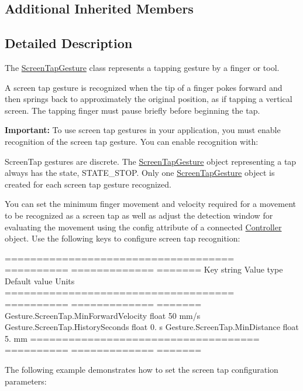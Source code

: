 \subsection*{Additional Inherited Members}


\subsection{Detailed Description}
The \hyperlink{class_leap_1_1_screen_tap_gesture}{Screen\+Tap\+Gesture} class represents a tapping gesture by a finger or tool.

A screen tap gesture is recognized when the tip of a finger pokes forward and then springs back to approximately the original position, as if tapping a vertical screen. The tapping finger must pause briefly before beginning the tap.



{\bfseries Important\+:} To use screen tap gestures in your application, you must enable recognition of the screen tap gesture. You can enable recognition with\+:


\begin{DoxyCodeInclude}
\end{DoxyCodeInclude}


Screen\+Tap gestures are discrete. The \hyperlink{class_leap_1_1_screen_tap_gesture}{Screen\+Tap\+Gesture} object representing a tap always has the state, S\+T\+A\+T\+E\+\_\+\+S\+T\+OP. Only one \hyperlink{class_leap_1_1_screen_tap_gesture}{Screen\+Tap\+Gesture} object is created for each screen tap gesture recognized.

You can set the minimum finger movement and velocity required for a movement to be recognized as a screen tap as well as adjust the detection window for evaluating the movement using the config attribute of a connected \hyperlink{class_leap_1_1_controller}{Controller} object. Use the following keys to configure screen tap recognition\+:

==================================== ========== ============= ======= Key string Value type Default value Units ==================================== ========== ============= ======= Gesture.\+Screen\+Tap.\+Min\+Forward\+Velocity float 50 mm/s Gesture.\+Screen\+Tap.\+History\+Seconds float 0. s Gesture.\+Screen\+Tap.\+Min\+Distance float 5. mm ==================================== ========== ============= ======= 

The following example demonstrates how to set the screen tap configuration parameters\+:


